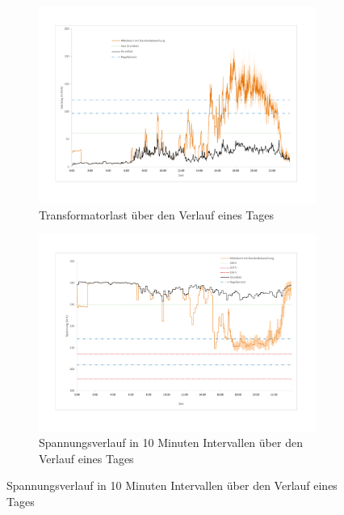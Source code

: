 \begin{figure}
	\begin{subfigure}{\linewidth}
		\includegraphics[scale=0.5]{img/SA_wT/TrafoLast4.pdf}
		\caption{Transformatorlast über den Verlauf eines Tages}
		\label{Abb_SAwtTrafoLast}
	\end{subfigure}
	\begin{subfigure}{\linewidth}
		\includegraphics[scale=0.5]{img/SA_wT/Voltage.pdf}
		\caption{Spannungsverlauf in 10 Minuten Intervallen über den Verlauf eines Tages}
		\label{Abb_SAwtSpannung}
	\end{subfigure}
\end{figure}

